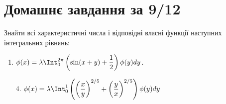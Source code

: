 \setcounter{section}{1}

\section{Домашнє завдання за 9/12}

\begin{problem}[Владимиров 5.18]
    Знайти всі характеристичні числа і відповідні власні функції наступних інтегральних рівнянь:
    \begin{enumerate}
        \item $\phi(x) = \lambda \Int_0^{2\pi} \left(\sin(x+y)+\dfrac12\right)\phi(y)dy$.
        \item[4.] $\phi(x) = \lambda \Int_0^1 \left(\left(\dfrac xy\right)^{2/5}+\bigg(\dfrac yx\bigg)^{2/5}\right)\phi(y)dy$
    \end{enumerate}
\end{problem}


